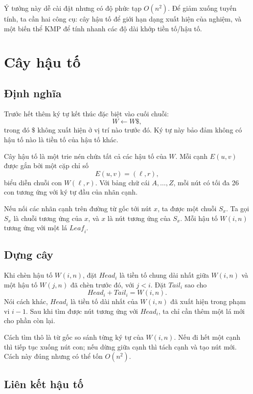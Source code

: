 \documentclass[11pt]{article}
\begin{document}
Ý tưởng này dễ cài đặt nhưng có độ phức tạp \(O(n^2)\). Để giảm xuống tuyến
tính, ta cần hai công cụ: cây hậu tố để giới hạn dạng xuất hiện của nghiệm,
và một biến thể KMP để tính nhanh các độ dài khớp tiền tố/hậu tố.

\section{Cây hậu tố}

\subsection{Định nghĩa}

Trước hết thêm ký tự kết thúc đặc biệt vào cuối chuỗi:
\[
  W\leftarrow W\$,
\]
trong đó \(\$\) không xuất hiện ở vị trí nào trước đó. Ký tự này bảo đảm
không có hậu tố nào là tiền tố của hậu tố khác.

Cây hậu tố là một trie nén chứa tất cả các hậu tố của \(W\). Mỗi cạnh
\(E(u,v)\) được gắn bởi một cặp chỉ số
\[
  E(u,v)=(\ell,r),
\]
biểu diễn chuỗi con \(W(\ell,r)\). Với bảng chữ cái \(A,\ldots,Z\), mỗi nút
có tối đa 26 con tương ứng với ký tự đầu của nhãn cạnh.

Nếu nối các nhãn cạnh trên đường từ gốc tới nút \(x\), ta được một chuỗi
\(S_x\). Ta gọi \(S_x\) là chuỗi tương ứng của \(x\), và \(x\) là nút tương
ứng của \(S_x\). Mỗi hậu tố \(W(i,n)\) tương ứng với một lá
\(\mathit{Leaf}_i\).

\subsection{Dựng cây}

Khi chèn hậu tố \(W(i,n)\), đặt \(\mathit{Head}_i\) là tiền tố chung dài nhất
giữa \(W(i,n)\) và một hậu tố \(W(j,n)\) đã chèn trước đó, với \(j<i\). Đặt
\(\mathit{Tail}_i\) sao cho
\[
  \mathit{Head}_i+\mathit{Tail}_i=W(i,n).
\]
Nói cách khác, \(\mathit{Head}_i\) là tiền tố dài nhất của \(W(i,n)\) đã xuất
hiện trong phạm vi \(i-1\). Sau khi tìm được nút tương ứng với
\(\mathit{Head}_i\), ta chỉ cần thêm một lá mới cho phần còn lại.

Cách tìm thô là từ gốc so sánh từng ký tự của \(W(i,n)\). Nếu đi hết một
cạnh thì tiếp tục xuống nút con; nếu dừng giữa cạnh thì tách cạnh và tạo nút
mới. Cách này đúng nhưng có thể tốn \(O(n^2)\).

\subsection{Liên kết hậu tố}
\end{document}
